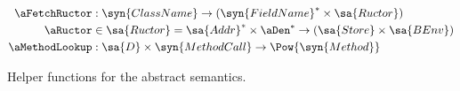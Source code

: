 \begin{figure}
  \begin{small}\begin{align*}
\aFetchRuctor &: \syn{ClassName} \to (\syn{FieldName}^* \times \sa{Ructor})
    \\
  \aRuctor &\in 
  \sa{Ructor} = 
\sa{Addr}^*
\times 
\aDen^*
\to
  (
\sa{Store}
\times 
\sa{BEnv}
)
  \\
  \aMethodLookup & : \sa{D} \times \syn{MethodCall} \to \Pow{\syn{Method}}
  \end{align*}\end{small}


  \caption{Helper functions for the abstract semantics.}
  \label{fig:abstract-anfw-java-helper}
\end{figure}





